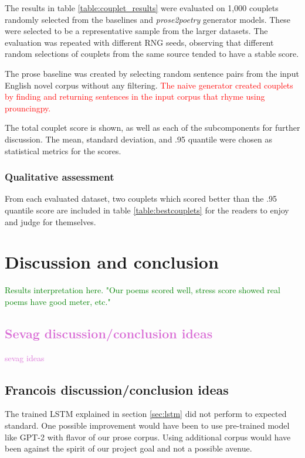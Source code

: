 \documentclass[11pt,a4paper]{article}
\begin{document}
The results in table \ref{table:couplet_results} were evaluated on 1,000 couplets randomly selected from the baselines and \textit{prose2poetry} generator models. These were selected to be a representative sample from the larger datasets. The evaluation was repeated with different RNG seeds, observing that different random selections of couplets from the same source tended to have a stable score.

The prose baseline was created by selecting random sentence pairs from the input English novel corpus without any filtering. \textcolor{red}{The naive generator created couplets by finding and returning sentences in the input corpus that rhyme using prouncingpy.}

The total couplet score is shown, as well as each of the subcomponents for further discussion. The mean, standard deviation, and .95 quantile were chosen as statistical metrics for the scores.

\subsubsection{Qualitative assessment}

From each evaluated dataset, two couplets which scored better than the .95 quantile score are included in table \ref{table:bestcouplets} for the readers to enjoy and judge for themselves.

\section{Discussion and conclusion}
\label{sec:discconc}

\textcolor{green}{
Results interpretation here. "Our poems scored well, stress score showed real poems have good meter, etc."
}

\textcolor{Orchid}{
\subsection{Sevag discussion/conclusion ideas}
sevag ideas
}

\subsection{Francois discussion/conclusion ideas}
The trained LSTM explained in section \ref{sec:lstm} did not perform to expected standard. One possible improvement would have been to use pre-trained model like GPT-2 \cite{gpt2} with flavor of our prose corpus. Using additional corpus would have been against the spirit of our project goal and not a possible avenue.
\end{document}
